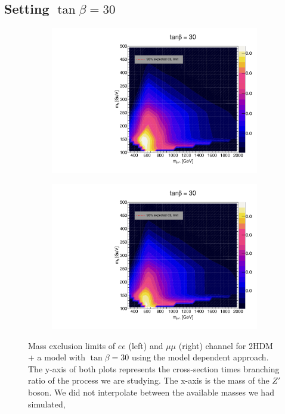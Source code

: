 \documentclass[12pt, a4paper]{book}
\begin{document}
\clearpage
\subsection{Setting $\tan\beta=30$}
\begin{figure}[!ht]
	\centering
   \begin{subfigure}[b]{0.49\textwidth}
      \centering
      \includegraphics[width=1\textwidth]{Limits/2HDM/2HDM_ee_tb30.pdf}
      \end{subfigure}
   \hfill
   \begin{subfigure}[b]{0.49\textwidth}
      \centering
      \includegraphics[width=1\textwidth]{Limits/2HDM/2HDM_uu_tb30.pdf}
      \end{subfigure}
   \caption[Expected mass exclusion limits of $ee$ and $\mu\mu$ channel for all 2HDM + a model with $\tan\beta=30$ using the model dependent approach]{Mass exclusion limits of $ee$ (left) and $\mu\mu$ (right) channel for 2HDM + a model with $\tan\beta=30$ using the model dependent approach. The y-axis of both plots represents the cross-section times branching ratio of the process we are studying. The x-axis is the mass of the $Z'$ boson. We did not interpolate between the available masses we had simulated, 
}
\end{figure}
\end{document}
